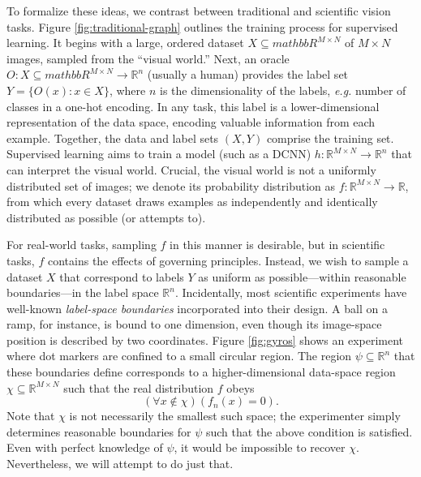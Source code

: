 \documentclass[10pt, draftcls]{IEEEtran}
\begin{document}
To formalize these ideas, we contrast between traditional and scientific vision
tasks. Figure \ref{fig:traditional-graph} outlines the training process for
supervised learning. It begins with a large, ordered dataset
$X \subseteq mathbb{R}^{M \times N}$ of $M \times N$ images, sampled from the
``visual world.'' Next, an oracle
$O : X \subseteq mathbb{R}^{M \times N} \rightarrow \mathbb{R}^n$ (usually a
human) provides the label set $Y = \{O(x) : x \in X\}$, where $n$ is the
dimensionality of the labels, \emph{e.g.} number of classes in a one-hot
encoding. In any task, this label is a lower-dimensional representation of
the data space, encoding valuable information from each example. Together, the
data and label sets $(X,Y)$ comprise the training set. Supervised learning
aims to train a model (such as a DCNN)
$h : \mathbb{R}^{M\times N} \rightarrow \mathbb{R}^n$ that can interpret the
visual world. Crucial, the visual world is not a uniformly distributed set of
images; we denote its probability distribution as
$f : \mathbb{R}^{M\times N} \rightarrow \mathbb{R}$, from which every dataset
draws examples as independently and identically distributed as possible (or
attempts to).

For real-world tasks, sampling $f$ in this manner is desirable, but in
scientific tasks, $f$ contains the effects of governing principles. Instead, we
wish to sample a dataset $X$ that correspond to labels $Y$ as uniform as
possible---within reasonable boundaries---in the label space
$\mathbb{R}^n$. Incidentally, most scientific experiments have well-known
\emph{label-space boundaries} incorporated into their design. A ball on a
ramp, for instance, is bound to one dimension, even though its image-space
position is described by two coordinates. Figure \ref{fig:gyros} shows an
experiment where dot markers are confined to a small circular region. The region
$\psi \subseteq \mathbb{R}^n$ that these boundaries define corresponds to a
higher-dimensional data-space region $\chi \subseteq \mathbb{R}^{M\times N}$
such that the real distribution $f$ obeys
\[ (\forall x \not\in \chi)(f_n(x) = 0). \] Note that $\chi$ is not necessarily
the smallest such space; the experimenter simply determines reasonable
boundaries for $\psi$ such that the above condition is satisfied. Even with
perfect knowledge of $\psi$, it would be impossible to recover
$\chi$. Nevertheless, we will attempt to do just that.
\end{document}
